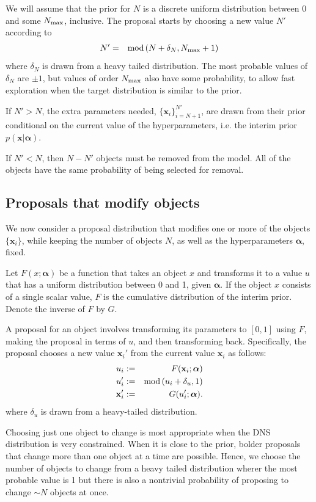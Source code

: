 \documentclass[letterpaper, 11pt]{article}
\newcommand{\hyperparams}{\boldsymbol{\alpha}}
\newcommand{\xx}{\mathbf{x}}
\begin{document}
We will assume that the prior for $N$ is a discrete uniform distribution
between 0 and some $N_{\rm max}$, inclusive. The proposal starts by choosing
a new value $N'$ according to
\begin{eqnarray}
N' &=& \textnormal{mod}\left(N + \delta_N, N_{\rm max} + 1\right)
\end{eqnarray}
where $\delta_N$ is drawn from a heavy tailed
distribution. The most probable values of $\delta_N$ are $\pm 1$, but values
of order $N_{\rm max}$ also have some probability, to allow fast exploration
when the target distribution is similar to the prior.

If $N' > N$, the extra parameters needed, $\{\xx_i\}_{i=N+1}^{N'}$,
are drawn from their prior conditional on the current value of the
hyperparameters, i.e. the interim prior $p(\xx | \hyperparams)$.

If $N' < N$, then $N - N'$ objects must be removed from the model. All
of the objects have the same probability of being selected for removal.

\subsection{Proposals that modify objects}\label{sec:proposal2}
We now consider a proposal distribution that modifies one or more of the
objects $\{\xx_i\}$, while keeping the number of objects $N$, as well as the
hyperparameters $\hyperparams$, fixed.

Let $F(x; \hyperparams)$ be a function that takes an object $x$ and transforms it
to a value $u$ that has a uniform distribution between 0 and 1, given $\hyperparams$.
If the object $x$ consists of a single scalar value, $F$ is the cumulative
distribution of the interim prior. Denote the inverse of $F$ by $G$.

A proposal
for an object involves transforming its parameters to $[0, 1]$ using $F$,
making the proposal in terms of $u$, and then transforming back.
Specifically, the proposal chooses
a new value $\xx_i'$ from the current value $\xx_i$ as follows:
\begin{eqnarray}
u_i &:=& F(\xx_i; \hyperparams)\\
u_i' &:=& \textnormal{mod}\left(u_i + \delta_u, 1\right)\\
\xx_i' &:=& G(u_i'; \hyperparams).
\end{eqnarray}
where $\delta_u$ is drawn from a heavy-tailed distribution.

Choosing just one object to change is most appropriate when the DNS
distribution is very constrained. When it is close to the prior, bolder
proposals that change more than one object at a time are possible. Hence,
we choose the number of objects to change from a heavy tailed distribution
wherer the most probable value is 1 but there is also a nontrivial probability
of proposing to change $\sim N$ objects at once.
\end{document}
